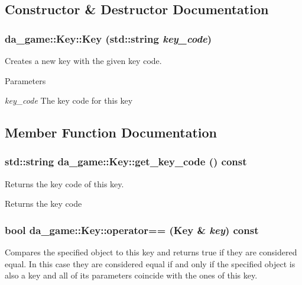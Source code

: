 \subsection{Constructor \& Destructor Documentation}
\hypertarget{classda__game_1_1Key_a15fcc235eb6d5c76e574fd02ab9bad4b}{
\subsubsection[{Key}]{\setlength{\rightskip}{0pt plus 5cm}da\_\-game::Key::Key (std::string {\em key\_\-code})}}
\label{classda__game_1_1Key_a15fcc235eb6d5c76e574fd02ab9bad4b}
Creates a new key with the given key code.


\begin{DoxyParams}{Parameters}
\item[{\em key\_\-code}]The key code for this key \end{DoxyParams}


\subsection{Member Function Documentation}
\hypertarget{classda__game_1_1Key_a1d96d265ce05db8566dfd62615de61c6}{
\subsubsection[{get\_\-key\_\-code}]{\setlength{\rightskip}{0pt plus 5cm}std::string da\_\-game::Key::get\_\-key\_\-code () const}}
\label{classda__game_1_1Key_a1d96d265ce05db8566dfd62615de61c6}
Returns the key code of this key.

\begin{DoxyReturn}{Returns}
the key code 
\end{DoxyReturn}
\hypertarget{classda__game_1_1Key_af3b5c0256dfcfc935e898d27dd47ffeb}{
\subsubsection[{operator==}]{\setlength{\rightskip}{0pt plus 5cm}bool da\_\-game::Key::operator== ({\bf Key} \& {\em key}) const}}
\label{classda__game_1_1Key_af3b5c0256dfcfc935e898d27dd47ffeb}
Compares the specified object to this key and returns true if they are considered equal. In this case they are considered equal if and only if the specified object is also a key and all of its parameters coincide with the ones of this key.

